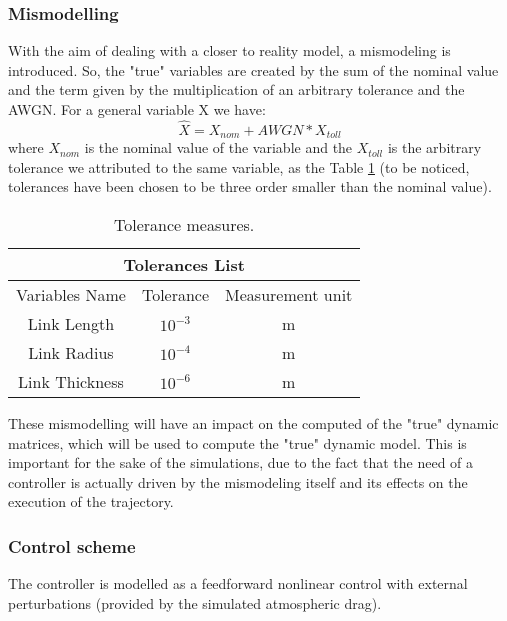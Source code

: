 \documentclass[main.tex]{subfiles}
\begin{document}
\subsubsection{Mismodelling}
With the aim of dealing with a closer to reality model, a mismodeling is introduced. So, the "true" variables are created by the sum of the nominal value and the term given by the multiplication of an arbitrary tolerance and the AWGN. For a general variable X we have:
$$\hat X = X_{nom} + AWGN*X_{toll} $$
where $X_{nom}$ is the nominal value of the variable and the $X_{toll}$ is the arbitrary tolerance we attributed to the same variable, as the Table \ref{tab:TAB} (to be noticed, tolerances have been chosen to be three order smaller than the nominal value).

\begin{table}[!h]
\begin{center}
\begin{tabular}{||c c c||} 
     \hline
    \multicolumn{3}{|c|}{Tolerances List} \\
    \hline
    Variables Name& Tolerance &Measurement unit\\
    \hline
     Link Length & $10^{-3}$ & m\\
     Link Radius & $10^{-4}$ & m\\
     Link Thickness & $10^{-6}$ & m\\
    \hline
\end{tabular}
\caption{\label{tab:TAB} Tolerance measures.}
\end{center}
\end{table}

These mismodelling will have an impact on the computed of the "true" dynamic matrices, which will be used to compute the "true" dynamic model. This is important for the sake of the simulations, due to the fact that the need of a controller is actually driven by the mismodeling itself and its effects on the execution of the trajectory.


\subsubsection{Control scheme}
The controller is modelled as a feedforward nonlinear control with external perturbations (provided by the simulated atmospheric drag).\\
\end{document}
